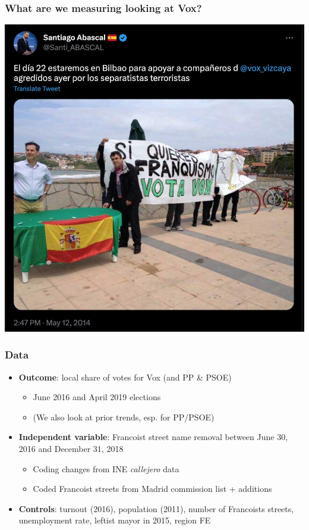 \documentclass[aspectratio=43]{beamer}
\begin{document}
\begin{frame}
\frametitle{What are we measuring looking at Vox?}
\centering

\includegraphics[width = .7\textwidth]{img/vox_franquismo}

\end{frame}

\begin{frame}
\frametitle{Data}
\centering

\begin{itemize}
  \item<1-> \textbf{Outcome}: local share of votes for Vox (and PP \& PSOE)
  \begin{itemize}
    \item June 2016 and April 2019 elections
    \item (We also look at prior trends, esp. for PP/PSOE)
  \end{itemize}
  \item<2-> \textbf{Independent variable}: Francoist street name removal between June 30, 2016 and December 31, 2018
  \begin{itemize}
    \item Coding changes from INE \textit{callejero} data
    \item Coded Francoist streets from Madrid commission list + additions
  \end{itemize}
  \item<3-> \textbf{Controls}: turnout (2016), population (2011), number of Francoists streets, unemployment rate, leftist mayor in 2015, region FE
\end{itemize}

\end{frame}
\end{document}
